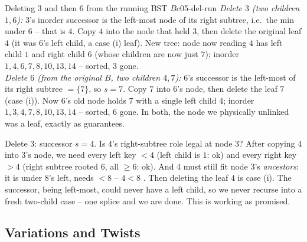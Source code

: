 \begin{example}{Deleting $3$ and then $6$ from the running BST $B$}{c05-del-run}
\emph{Delete $3$ (two children $1,6$):} $3$'s inorder successor is the left-most node of its right
subtree, i.e.\ the min under $6$ -- that is $4$. Copy $4$ into the node that held $3$, then delete the
original leaf $4$ (it was $6$'s left child, a case (i) leaf). New tree: node now reading $4$ has left
child $1$ and right child $6$ (whose children are now just $7$); inorder
$1,4,6,7,8,10,13,14$ -- sorted, $3$ gone. \checkmark\\
\emph{Delete $6$ (from the original $B$, two children $4,7$):} $6$'s successor is the left-most of its
right subtree $=\{7\}$, so $s=7$. Copy $7$ into $6$'s node, then delete the leaf $7$ (case (i)). Now
$6$'s old node holds $7$ with a single left child $4$; inorder $1,3,4,7,8,10,13,14$ -- sorted, $6$
gone. \checkmark In both, the node we physically unlinked was a leaf, exactly as 
guarantees.
\end{example}
\begin{tracebox}
Delete $3$: successor $s=4$. Is $4$'s right-subtree role legal at node $3$? After copying $4$ into
$3$'s node, we need every left key $<4$ (left child is $1$: ok) and every right key $>4$ (right
subtree rooted $6$, all $\ge 6$: ok). And $4$ must still fit node $3$'s \emph{ancestors}: it is under
$8$'s left, needs $<8$ -- $4<8$ \checkmark. Then deleting the leaf $4$ is case (i). The successor,
being left-most, could never have a left child, so we never recurse into a fresh two-child case --
one splice and we are done. This is  working as promised.
\end{tracebox}

\subsection{Variations and Twists}

